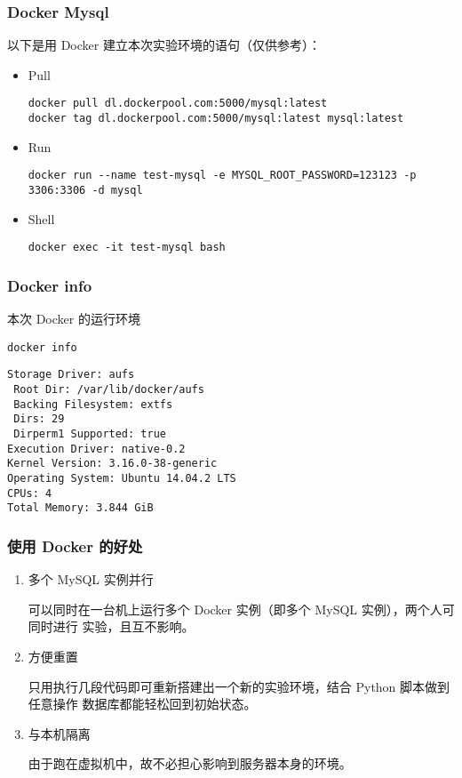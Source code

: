 \documentclass[11pt]{article}
\begin{document}
\subsubsection{Docker Mysql}
\label{sec-2-2-2}
以下是用 Docker 建立本次实验环境的语句（仅供参考）：
\begin{itemize}
\item Pull
\begin{lstlisting}
docker pull dl.dockerpool.com:5000/mysql:latest
docker tag dl.dockerpool.com:5000/mysql:latest mysql:latest
\end{lstlisting}
\item Run
\begin{lstlisting}
docker run --name test-mysql -e MYSQL_ROOT_PASSWORD=123123 -p 3306:3306 -d mysql
\end{lstlisting}
\item Shell
\begin{lstlisting}
docker exec -it test-mysql bash
\end{lstlisting}
\end{itemize}
\subsubsection{Docker info}
\label{sec-2-2-3}
本次 Docker 的运行环境

\begin{lstlisting}
docker info
\end{lstlisting}

\begin{verbatim}
Storage Driver: aufs
 Root Dir: /var/lib/docker/aufs
 Backing Filesystem: extfs
 Dirs: 29
 Dirperm1 Supported: true
Execution Driver: native-0.2
Kernel Version: 3.16.0-38-generic
Operating System: Ubuntu 14.04.2 LTS
CPUs: 4
Total Memory: 3.844 GiB
\end{verbatim}
\subsubsection{使用 Docker 的好处}
\label{sec-2-2-4}
\begin{enumerate}
\item 多个 MySQL 实例并行

可以同时在一台机上运行多个 Docker 实例（即多个 MySQL 实例），两个人可同时进行
实验，且互不影响。

\item 方便重置

只用执行几段代码即可重新搭建出一个新的实验环境，结合 Python 脚本做到任意操作
数据库都能轻松回到初始状态。

\item 与本机隔离

由于跑在虚拟机中，故不必担心影响到服务器本身的环境。
\end{enumerate}
\end{document}

